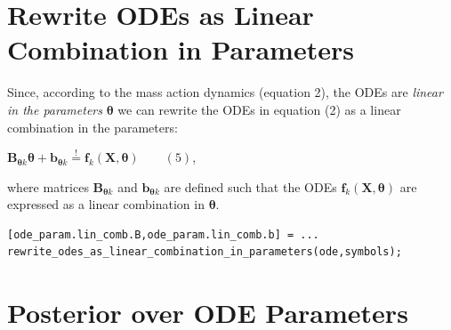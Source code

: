 \section{Rewrite ODEs as Linear Combination in Parameters}

\begin{par}
Since, according to the mass action dynamics (equation 2), the ODEs are \textit{linear in the parameters} $\boldsymbol\theta$ we can rewrite the ODEs in equation (2) as a linear combination in the parameters:
\end{par} \vspace{1em}
\begin{par}
$\mathbf{B}_{\boldsymbol\theta k} \boldsymbol\theta + \mathbf{b}_{\boldsymbol\theta k} \stackrel{!}{=}\mathbf{f}_k(\mathbf{X},\boldsymbol\theta) \qquad (5)$,
\end{par} \vspace{1em}
\begin{par}
where matrices $\mathbf{B}_{\boldsymbol\theta k}$ and $\mathbf{b}_{\boldsymbol\theta k}$ are defined such that the ODEs $\mathbf{f}_k(\mathbf{X},\boldsymbol\theta)$ are expressed as a linear combination in $\boldsymbol\theta$.
\end{par} \vspace{1em}
\color{RoyalPurple}\begin{verbatim}
[ode_param.lin_comb.B,ode_param.lin_comb.b] = ...
rewrite_odes_as_linear_combination_in_parameters(ode,symbols);
\end{verbatim}
\color{black}


\section{Posterior over ODE Parameters}

